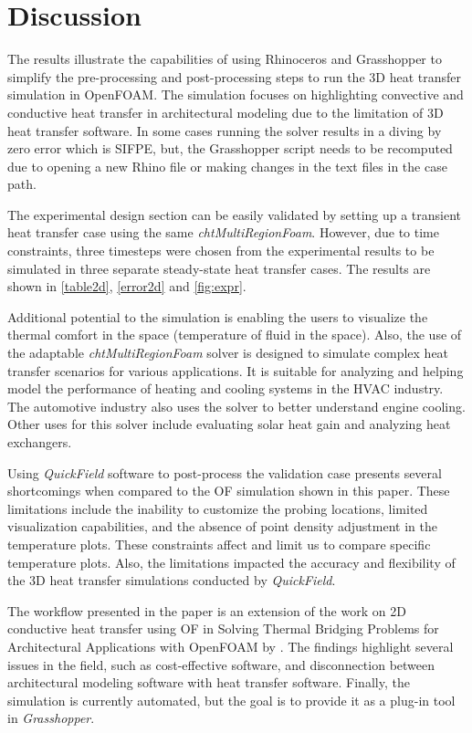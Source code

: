 \section{Discussion}
The results illustrate the capabilities of using Rhinoceros and Grasshopper to simplify the pre-processing and post-processing steps to run the 3D heat transfer simulation in OpenFOAM. The simulation focuses on highlighting convective and conductive heat transfer in architectural modeling due to the limitation of 3D heat transfer software.
In some cases running the solver results in a diving by zero error which is SIFPE, but, the Grasshopper script needs to be recomputed due to opening a new Rhino file or making changes in the text files in the case path. 

The experimental design section can be easily validated by setting up a transient heat transfer case using the same \textit{chtMultiRegionFoam}. However, due to time constraints, three timesteps were chosen from the experimental results to be simulated in three separate steady-state heat transfer cases. The results are shown in \ref{table2d}, \ref{error2d} and \ref{fig:expr}. 

Additional potential to the simulation is enabling the users to visualize the thermal comfort in the space (temperature of fluid in the space). Also, the use of the adaptable \textit{chtMultiRegionFoam} solver is designed to simulate complex heat transfer scenarios for various applications. It is suitable for analyzing and helping model the performance of heating and cooling systems in the HVAC  industry. The automotive industry also uses the solver to better understand engine cooling. Other uses for this solver include evaluating solar heat gain and analyzing heat exchangers.

Using \textit{QuickField} software to post-process the validation case presents several shortcomings when compared to the OF simulation shown in this paper. These limitations include the inability to customize the probing locations, limited visualization capabilities, and the absence of point density adjustment in the temperature plots. These constraints affect and limit us to compare specific temperature plots. 
Also, the limitations impacted the accuracy and flexibility of the 3D heat transfer simulations conducted by \textit{QuickField}. 

The workflow presented in the paper is an extension of the work on 2D conductive heat transfer using OF in Solving Thermal Bridging Problems for Architectural Applications with OpenFOAM by \cite{kastner2020solving}. 
The findings highlight several issues in the field, such as cost-effective software, and disconnection between architectural modeling software with heat transfer software. Finally, the simulation is currently automated, but the goal is to provide it as a plug-in tool in \textit{Grasshopper}.